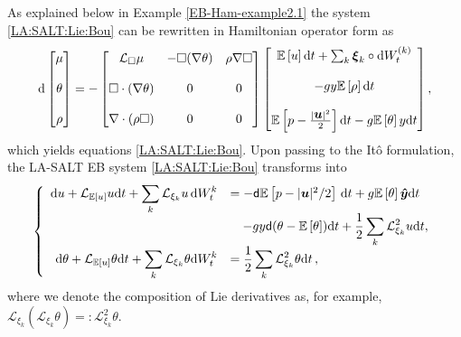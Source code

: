 \documentclass[11pt, oneside]{article}   	%
\numberwithin{equation}{section}
\theoremstyle{plain}
\theoremstyle{definition}
\theoremstyle{remark}
\newcommand{\<}{\langle}
\renewcommand{\>}{\rangle}
\def\diff{\textnormal{d}}
\newcommand{\mb}[1]{\mbox{\boldmath{$#1$}}}
\newcommand{\E}[1]{\mathbb{E}\left[{#1}\right]}
\begin{document}
As explained below in Example \ref{EB-Ham-example2.1} the system \eqref{LA:SALT:Lie:Bou} 
can be rewritten in Hamiltonian operator form as 
\begin{align}
\diff 
\begin{bmatrix}
\mu \\ \\  \theta \\ \\ \rho 
\end{bmatrix}
= -
\begin{bmatrix}
 \mathcal{L}_{\Box} \mu &  - \Box  (\nabla \theta)    &  \rho \nabla {\Box}
\\ \\
\Box \cdot (\nabla \theta) & 0 & 0 \\ \\
 \nabla \cdot  (\rho \Box) & 0 & 0
\end{bmatrix}
\begin{bmatrix}
 \E{u}\diff t + \sum_k {\mb \xi_k}\circ \diff W^{(k)}_t
\\ \\ -g y \E{\rho} \diff t \\ \\ \E{ p  - \frac{ |\mb{u}|^2}{2} }\diff t  - g\E{\theta} y \diff t
\end{bmatrix},
\label{Ham-matrix-Boussinesq2-1}
\end{align}
which yields equations \eqref{LA:SALT:Lie:Bou}. 
Upon passing to the It\^o formulation, the LA-SALT EB system \eqref{LA:SALT:Lie:Bou} transforms into 
\begin{equation}\label{LA:SALT:Ito:Bou}
\left\{
\begin{array}{rl}
\diff {u} + \mathcal L_{\mathbb E[u]} {u} \diff t 
+  \displaystyle\sum_k \mathcal L_{\xi_k} {u} \, \diff W_t^k 
&= - {\sf{d}} \E{p -  |\mb{u}|^2/2} \, \diff t + g \E{\theta} \mb{\hat{y}} \diff t 
\\ & \quad
- gy {\sf{d}} (\theta - \E{\theta}) \diff t 
+ \displaystyle \frac12 \sum_k \mathcal L_{\xi_k}^2 {u} \diff t, 
\\
\diff \theta + \mathcal L_{\mathbb E[u]} {\theta} \diff t + \displaystyle \displaystyle\sum_k \mathcal L_{\xi_k} {\theta}\diff W_t^k &=  \displaystyle \displaystyle \frac12 \sum_k \mathcal L_{\xi_k}^2 {\theta} \diff t\,,
\end{array}
\right.
\end{equation}
where we denote the composition of Lie derivatives as, for example,  $\mathcal L_{\xi_k}(\mathcal L_{\xi_k} {\theta}) =: \mathcal L_{\xi_k}^2 {\theta}$.
\end{document}
